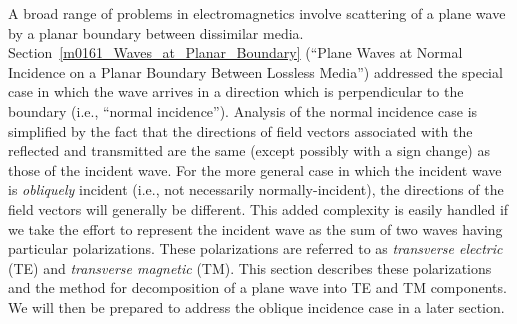 

\label{m0166_Decomposition_into_TE_and_TM} %

A broad range of problems in electromagnetics involve scattering of a plane wave by a planar boundary between dissimilar media.
Section~\ref{m0161_Waves_at_Planar_Boundary} (``Plane Waves at Normal Incidence on a Planar Boundary Between Lossless Media'') addressed the special case in which the wave arrives in a direction which is perpendicular to the boundary (i.e., ``normal incidence'').
Analysis of the normal incidence case is simplified by the fact that the directions of field vectors associated with the reflected and transmitted are the same (except possibly with a sign change) as those of the incident wave.  
For the more general case in which the incident wave is \emph{obliquely} incident (i.e., not necessarily normally-incident), the directions of the field vectors will generally be different.
This added complexity is easily handled if we take the effort to represent the incident wave as the sum of two waves having particular polarizations.  
These polarizations are referred to as \emph{transverse electric} (TE) and \emph{transverse magnetic} (TM).
This section describes these polarizations and the method for decomposition of a plane wave into TE and TM components.
We will then be prepared to address the oblique incidence case in a later section.

